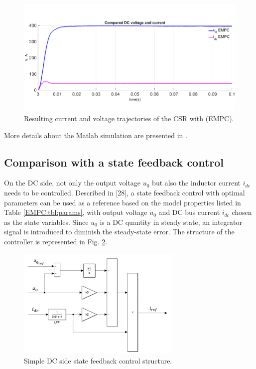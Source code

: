     \begin{figure}[!ht]
        \centering
        \includegraphics[width=\textwidth]{EMPC_PNG_Pics/Result_PerformanceEMPC.png}
        \caption{Resulting current and voltage trajectories of the CSR with (EMPC).}
        \label{EMPC:fig:Result_PerformanceEMPC}
    \end{figure}

    More details about the Matlab simulation are presented in \cite{neukirchner2019linkedmodel}.

    \subsection{Comparison with a state feedback control}\label{EMPC:sec:Comparison}

    On the DC side, not only the output voltage $u_0$ but also the inductor current $i_{dc}$ needs to be controlled. Described in [28], a state feedback control with optimal parameters can be used as a reference based on the model properties listed in Table \ref{EMPC:tbl:params}, with output voltage $u_0$ and DC bus current $i_{dc}$ chosen as the state variables. Since $u_0$ is a DC quantity in steady state, an integrator signal is introduced to diminish the steady-state error. The structure of the controller is represented in Fig. \ref{EMPC:fig:SFeedbackDC}.

    \begin{figure}[!ht]
        \centering
        \includegraphics[width=0.7\textwidth]{EMPC_PNG_Pics/SFeedbackDC.png}
        \caption{Simple DC side state feedback control structure.}
        \label{EMPC:fig:SFeedbackDC}
    \end{figure}

